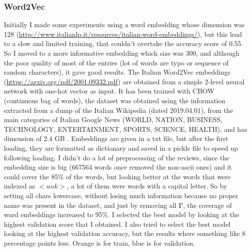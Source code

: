 \documentclass{article}
\begin{document}
            \subsubsection{Word2Vec}
            Initially I made some experiments using a word embedding whose dimension was 128 (\url{http://www.italianlp.it/resources/italian-word-embeddings/}),
            but this lead to a slow and limited training, that couldn't overtake the accuracy score of 0.55.
            So I moved to a more informative embedding which size was 300, and although the poor quality of most of the entries
            (lot of words are typo or sequence of random characters), it gave good results.
            The Italian Word2Vec embeddings (\url{https://arxiv.org/pdf/2001.09332.pdf}) are obtained from a simple 2-level neural network with one-hot vector as input.
            It has been trained with CBOW (continuous bag of words), the dataset was obtained using the information extracted from a dump of the Italian Wikipedia (dated 2019.04.01), from the main
categories of Italian Google News (WORLD, NATION, BUSINESS, TECHNOLOGY, ENTERTAINMENT, SPORTS, SCIENCE, HEALTH), and has dimension of 2.4 GB .
            Embeddings are given in a txt file, but after the first loading, they are formatted as dictionary and saved in a pickle file
            to speed up following loading.
            I didn't do a lot of preprocessing of the reviews, since the embedding size is big (667564 words once removed the non-ascii ones) and it could cover the 85\% of the words, but looking better at the words that were indexed as $<unk>$, a lot of them were words with a capital letter.
            So by setting all chars lowercase, without losing much information because no proper name was present in the dataset, and just by removing all \textbf{l'}, the coverage of ward embeddings increased to 95\%.
            I selected the best model by looking at the highest validation score that I obtained.
            I also tried to select the best model looking at the highest validation accuracy, but the results where something like 8 percentage points less.
            \color{orange} Orange is for train, \color{blue} blue is for validation.\color{black}
\end{document}
